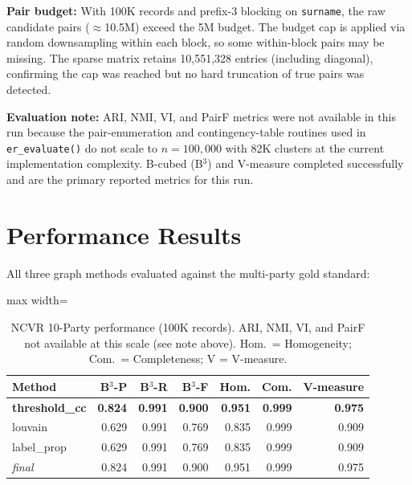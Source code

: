 \documentclass[11pt, a4paper]{article}
\begin{document}
\textbf{Pair budget:} With 100K records and prefix-3 blocking on \texttt{surname},
the raw candidate pairs ($\approx$10.5M) exceed the 5M budget. The budget cap
is applied via random downsampling within each block, so some within-block pairs
may be missing. The sparse matrix retains 10,551,328 entries (including diagonal),
confirming the cap was reached but no hard truncation of true pairs was detected.

\textbf{Evaluation note:} ARI, NMI, VI, and PairF metrics were not available in
this run because the pair-enumeration and contingency-table routines used in
\texttt{er\_evaluate()} do not scale to $n = 100{,}000$ with 82K clusters at the
current implementation complexity. B-cubed (B$^3$) and V-measure completed
successfully and are the primary reported metrics for this run.

\section{Performance Results}

All three graph methods evaluated against the multi-party gold standard:

\begin{table}[h!]
\centering
\begin{adjustbox}{max width=\linewidth}
\begin{tabular}{lrrrrrr}
\toprule
\textbf{Method} & \textbf{B$^3$-P} & \textbf{B$^3$-R} & \textbf{B$^3$-F} &
\textbf{Hom.} & \textbf{Com.} & \textbf{V-measure} \\
\midrule
\textbf{threshold\_cc} & \textbf{0.824} & \textbf{0.991} & \textbf{0.900} & \textbf{0.951} & \textbf{0.999} & \textbf{0.975} \\
louvain               & 0.629 & 0.991 & 0.769 & 0.835 & 0.999 & 0.909 \\
label\_prop           & 0.629 & 0.991 & 0.769 & 0.835 & 0.999 & 0.909 \\
\midrule
\textit{final}        & 0.824 & 0.991 & 0.900 & 0.951 & 0.999 & 0.975 \\
\bottomrule
\end{tabular}
\end{adjustbox}
\caption{NCVR 10-Party performance (100K records). ARI, NMI, VI, and PairF not available
at this scale (see note above). Hom.\ = Homogeneity; Com.\ = Completeness; V = V-measure.}
\end{table}
\end{document}
